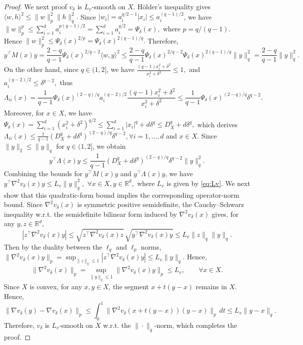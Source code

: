 \documentclass[10pt,a4paper]{amsart}
\begin{document}
\begin{proof}
We next proof $v_\delta$ is \(L_v\)-smooth on $X$.
 H\"older's inequality gives
\(
    \langle w,h\rangle^2
    \le
    \|w\|_p^2\|h\|_q^2.
\) 
Since \(|w_i|=a_i^{q/2-1}|x_i|\le a_i^{(q-1)/2}\), we have \(\|w\|_p^p\le\sum_{i=1}^d a_i^{p(q-1)/2}=\sum_{i=1}^d a_i^{q/2}=\Psi_\delta(x),\) where $p=q/(q-1)$. Hence \(\|w\|_p^2\le\Psi_\delta(x)^{2/p}=\Psi_\delta(x)^{2(q-1)/q}.\) Therefore,
\[
    y^\top M(x)y
    =
    \frac{2-q}{q-1}
 \Psi_\delta(x)^{2/q-2}
    \langle w,y\rangle^2  
    \le
    \frac{2-q}{q-1}   \Psi_\delta(x)^{2/q-2}    \Psi_\delta(x)^{2(q-1)/q}
    \|y\|_q^2        =
    \frac{2-q}{q-1}\|y\|_q^2 .
\]
On the other hand, since $q\in(1,2]$, we have \(\frac{(q-1)x_i^2+\delta^2}{x_i^2+\delta^2}\le 1,\) and \(a_i^{(q-2)/2}\le\delta^{q-2},\) thus
\[
    \Lambda_{ii}(x)
    =
    \frac{1}{q-1}
    \Psi_\delta(x)^{(2-q)/q}
    a_i^{(q-2)/2}
    \frac{(q-1)x_i^2+\delta^2}{x_i^2+\delta^2}              \le
    \frac{1}{q-1}
    \Psi_\delta(x)^{(2-q)/q}
    \delta^{q-2}.
\]
Moreover, for $x\in X$, we have \(\Psi_\delta(x)=\sum_{i=1}^d (x_i^2+\delta^2)^{q/2}\le\sum_{i=1}^d |x_i|^q+d\delta^q\le D_X^q+d\delta^q ,\) which derives
\(    \Lambda_{ii}(x)
    \le
    \frac{1}{q-1}
    (D_X^q+d\delta^q)^{(2-q)/q}\delta^{q-2}, \forall i=1,\ldots,d\) and \(x\in X.
\) 
Since $\|y\|_2\le \|y\|_q$ for $q\in(1,2]$, we obtain \[y^\top \Lambda(x)y\le\frac{1}{q-1}(D_X^q+d\delta^q)^{(2-q)/q}\delta^{q-2}\|y\|_q^2 .\]
Combining the bounds for $y^\top M(x)y$ and $y^\top \Lambda(x)y$, we have
\(
    y^\top \nabla^2 v_\delta(x)y
    \le
    L_{v}\|y\|_q^2,
    \) \(\forall x\in X,  y\in\mathbb R^d,
\)
where $L_v$ is given by \eqref{eq:Lv}.
We next show that this quadratic-form bound implies the corresponding
operator-norm bound. Since $\nabla^2 v_\delta(x)$ is symmetric positive
semidefinite, the Cauchy--Schwarz inequality w.r.t. the
semidefinite bilinear form induced by $\nabla^2 v_\delta(x)$ gives, for
any $y,z\in\mathbb{R}^d$,
\[
    |z^\top \nabla^2 v_\delta(x) y|
    \le
    \sqrt{z^\top \nabla^2 v_\delta(x) z}\,
    \sqrt{y^\top \nabla^2 v_\delta(x) y} 
    \le
    L_v \|z\|_q \|y\|_q .
\]
Then by the duality between the $\ell_q$ and $\ell_p$ norms,
\(\|\nabla^2 v_\delta(x)y\|_p
    = \sup_{\|z\|_q\le 1}
       |z^\top \nabla^2 v_\delta(x)y| 
    \le L_v\|y\|_q .\)
Hence,
\[
    \|\nabla^2 v_\delta(x)\|_p
    =\sup_{\|y\|_q\le1}
      \|\nabla^2 v_\delta(x)y\|_p
    \le L_v,
    \qquad \forall x\in X.
\]
Since $X$ is convex, for any $x,y\in X$, the segment $x+t(y-x)$ remains in $X$. Hence,
\[\|\nabla v_\delta(y)-\nabla v_\delta(x)\|_p\le\int_0^1\|\nabla^2v_\delta(x+t(y-x))(y-x)\|_p\,dt \le L_{v}\|y-x\|_q .\]
Therefore, $v_\delta$ is $L_{v}$-smooth on $X$ w.r.t. the $\|\cdot\|_q$-norm, which completes the proof.
\end{proof}
\end{document}
